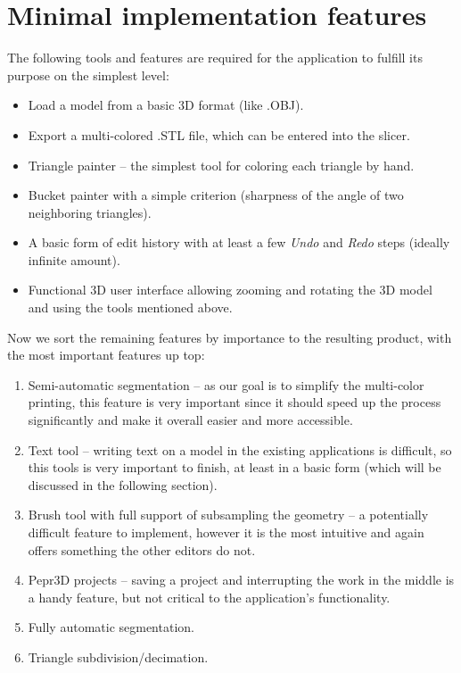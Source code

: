 \section{Minimal implementation features}

The following tools and features are required for the application to fulfill its purpose on the simplest level:

\begin{itemize}
\item Load a model from a basic 3D format (like .OBJ).
\item Export a multi-colored .STL file, which can be entered into the slicer.
\item Triangle painter -- the simplest tool for coloring each triangle by hand.
\item Bucket painter with a simple criterion (sharpness of the angle of two neighboring triangles).
\item A basic form of edit history with at least a few \textit{Undo} and \textit{Redo} steps (ideally infinite amount).
\item Functional 3D user interface allowing zooming and rotating the 3D model and using the tools mentioned above.
\end{itemize}

Now we sort the remaining features by importance to the resulting product, with the most important features up top:
\begin{enumerate}
\item Semi-automatic segmentation -- as our goal is to simplify the multi-color printing, this feature is very important since it should speed up the process significantly and make it overall easier and more accessible.
\item Text tool -- writing text on a model in the existing applications is difficult, so this tools is very important to finish, at least in a basic form (which will be discussed in the following section).
\item Brush tool with full support of subsampling the geometry -- a potentially difficult feature to implement, however it is the most intuitive and again offers something the other editors do not.
\item Pepr3D projects -- saving a project and interrupting the work in the middle is a handy feature, but not critical to the application's functionality.
\item Fully automatic segmentation.
\item Triangle subdivision/decimation.
\end{enumerate}

